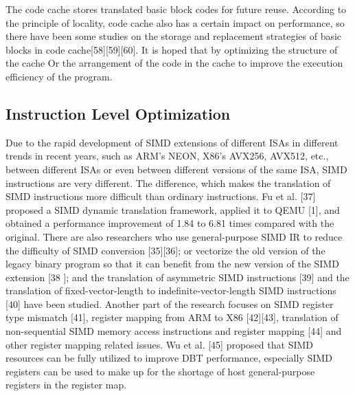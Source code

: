 The code cache stores translated basic block codes for future reuse.
According to the principle of locality, code cache also has a certain impact on performance, so there have been some studies on the storage and replacement strategies of basic blocks in code cache[58][59][60].
It is hoped that by optimizing the structure of the cache Or the arrangement of the code in the cache to improve the execution efficiency of the program.

\subsection{Instruction Level Optimization}
Due to the rapid development of SIMD extensions of different ISAs in different trends in recent years, such as ARM's NEON, X86's AVX256, AVX512, etc., between different ISAs or even between different versions of the same ISA, SIMD instructions are very different.
The difference, which makes the translation of SIMD instructions more difficult than ordinary instructions.
Fu et al. [37] proposed a SIMD dynamic translation framework, applied it to QEMU [1], and obtained a performance improvement of 1.84 to 6.81 times compared with the original.
There are also researchers who use general-purpose SIMD IR to reduce the difficulty of SIMD conversion [35][36]; or vectorize the old version of the legacy binary program so that it can benefit from the new version of the SIMD extension [38 ]; and the translation of asymmetric SIMD instructions [39] and the translation of fixed-vector-length to indefinite-vector-length SIMD instructions [40] have been studied.
Another part of the research focuses on SIMD register type mismatch [41], register mapping from ARM to X86 [42][43], translation of non-sequential SIMD memory access instructions and register mapping [44] and other register mapping related issues.
Wu et al. [45] proposed that SIMD resources can be fully utilized to improve DBT performance, especially SIMD registers can be used to make up for the shortage of host general-purpose registers in the register map.

